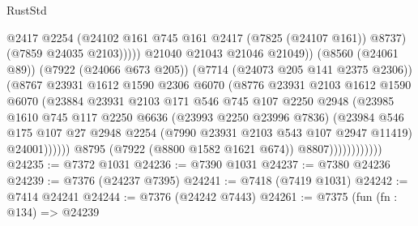 \begin{lexlean}{RustStd}
\begin{coremodule}
                                          @2417
                                          @2254
                                          (@24102 @161 @745 @161 @2417 (@7825 (@24107 @161)) @8737)
                                          (@7859 @24035 @2103)))))
                                  @21040
                                  @21043
                                  @21046
                                  @21049))
                              (@8560 (@24061 @89))
                              (@7922 (@24066 @673 @205))
                              (@7714 (@24073 @205 @141 @2375 @2306))
                              (@8767
                                @23931
                                @1612
                                @1590
                                @2306
                                @6070
                                (@8776
                                  @23931
                                  @2103
                                  @1612
                                  @1590
                                  @6070
                                  (@23884
                                    @23931
                                    @2103
                                    @171
                                    @546
                                    @745
                                    @107
                                    @2250
                                    @2948
                                    (@23985
                                      @1610
                                      @745
                                      @117
                                      @2250
                                      @6636
                                      (@23993 @2250 @23996 @7836)
                                      (@23984
                                        @546
                                        @175
                                        @107
                                        @27
                                        @2948
                                        @2254
                                        (@7990 @23931 @2103 @543 @107 @2947 @11419)
                                        @24001))))))
                            @8795
                            (@7922 (@8800 @1582 @1621 @674))
                            @8807))))))))))))
@24235 := @7372 @1031
@24236 := @7390 @1031
@24237 := @7380 @24236
@24239 := @7376 (@24237 @7395)
@24241 := @7418 (@7419 @1031)
@24242 := @7414 @24241
@24244 := @7376 (@24242 @7443)
@24261 := @7375
    (fun (fn : @134) =>
    @24239

\end{coremodule}
\end{lexlean}
